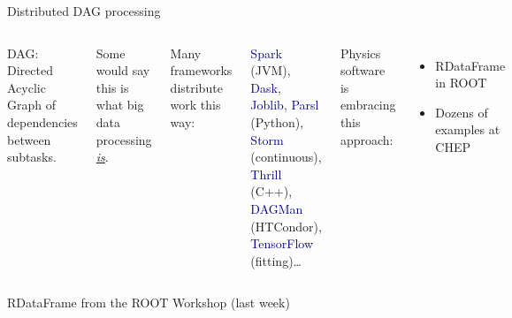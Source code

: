 \documentclass[aspectratio=169]{beamer}
\begin{document}
\begin{frame}{Distributed DAG processing}
\begin{columns}
DAG: Directed Acyclic Graph of dependencies between subtasks.

Some would say this is what big data processing \underline{\it is}.

\vspace{1 cm}
Many frameworks distribute work this way:

\vspace{0.2 cm}
\hfill \begin{minipage}{0.95\linewidth}
\textcolor{darkblue}{Spark} (JVM), \textcolor{darkblue}{Dask}, \textcolor{darkblue}{Joblib}, \textcolor{darkblue}{Parsl} (Python), \textcolor{darkblue}{Storm} (continuous), \textcolor{darkblue}{Thrill} (C++), \textcolor{darkblue}{DAGMan} (HTCondor), \textcolor{darkblue}{TensorFlow} (fitting)\ldots
\end{minipage}

\vspace{1 cm}
Physics software is embracing this approach:

\begin{itemize}
\item RDataFrame in ROOT
\item Dozens of examples at CHEP
\end{itemize}
\end{columns}
\end{frame}

\begin{frame}{RDataFrame from the ROOT Workshop (last week)}
\vspace{0.25 cm}
\end{frame}
\end{document}
